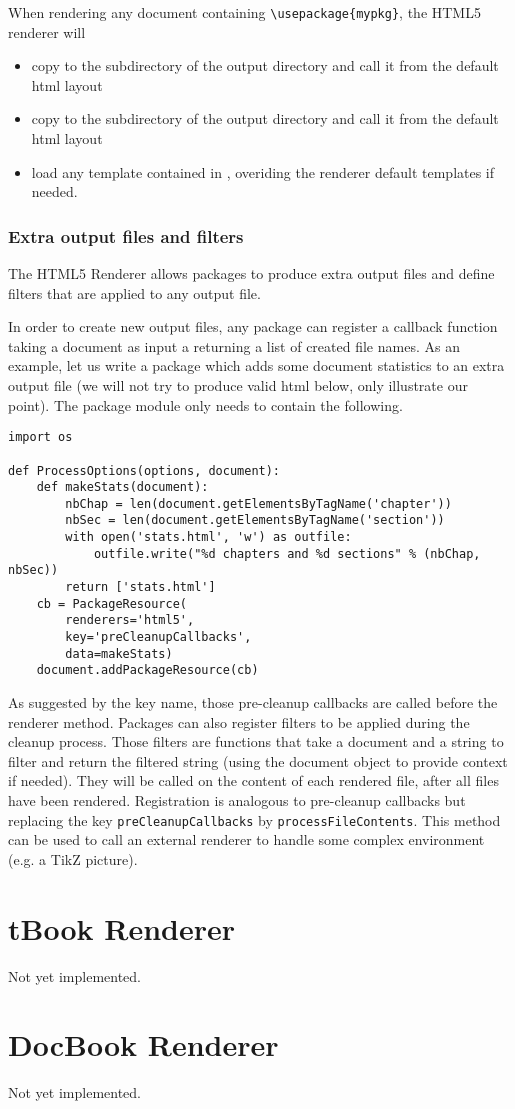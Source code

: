 When rendering any document containing \verb+\usepackage{mypkg}+,
the HTML5 renderer will
\begin{itemize}
\item 
    copy 
    to the  subdirectory of the output directory
    and call it from the default html layout
\item 
    copy 
    to the  subdirectory of the output directory
    and call it from the default html layout
\item
    load any template contained in , overiding the renderer default templates if needed.
\end{itemize}


\subsubsection*{Extra output files and filters}

The HTML5 Renderer allows packages to produce extra output files and
define filters that are applied to any output file. 

In order to create new output files, any package can register a callback
function taking a document as input a returning a list of created file
names. As an example, let us write a package which adds some document
statistics to an extra output file  (we will not try to
produce valid html below, only illustrate our point). The package module
only needs to contain the following.
\begin{verbatim}
import os

def ProcessOptions(options, document):
    def makeStats(document):
        nbChap = len(document.getElementsByTagName('chapter'))
        nbSec = len(document.getElementsByTagName('section'))
        with open('stats.html', 'w') as outfile:
            outfile.write("%d chapters and %d sections" % (nbChap, nbSec))
        return ['stats.html']
    cb = PackageResource(
        renderers='html5',
        key='preCleanupCallbacks',
        data=makeStats)
    document.addPackageResource(cb)
\end{verbatim}

As suggested by the key name, those pre-cleanup callbacks are called before
the renderer  method. Packages can also register filters to be
applied during the cleanup process. Those filters are functions that take a
document and a string to filter and return the filtered string (using the
document object to provide context if needed). They will be called on the
content of each rendered file, after all files have been rendered.
Registration is analogous to pre-cleanup callbacks but replacing the key
\verb+preCleanupCallbacks+ by \verb+processFileContents+. This method can be
used to call an external renderer to handle some complex environment (e.g. a
TikZ picture).


\section{tBook Renderer}

Not yet implemented.

\section{DocBook Renderer}

Not yet implemented.
